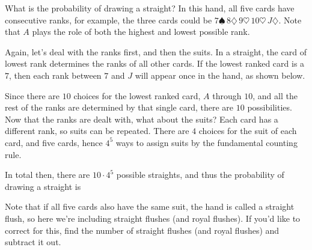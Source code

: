 \begin{examp}What is the probability of drawing a straight? In this hand, all five cards have consecutive ranks, for example, the three cards could be $7 \spadesuit \, 8\diamondsuit \, 9 \heartsuit \, 10 \heartsuit \, J \diamondsuit$. Note that $A$ plays the role of both the highest and lowest possible rank.
\par
\noindent Again, let's deal with the ranks first, and then the suits. In a straight, the card of lowest rank determines the ranks of all other cards. If the lowest ranked card is a $7$, then each rank between $7$ and $J$ will appear once in the hand, as shown below.

\vspace{-1em}
\begin{center}
\end{center}
\vspace{-1em}

\noindent Since there are $10$ choices for the lowest ranked card, $A$ through $10$, and all the rest of the ranks are determined by that single card, there are $10$ possibilities. Now that the ranks are dealt with, what about the suits? Each card has a different rank, so suits can be repeated. There are $4$ choices for the suit of each card, and five cards, hence $4^5$ ways to assign suits by the fundamental counting rule.
\par
\noindent In total then, there are $10 \cdot 4^5$ possible straights, and thus the probability of drawing a straight is 
\par
\noindent Note that if all five cards also have the same suit, the hand is called a straight flush, so here we're including straight flushes (and royal flushes). If you'd like to correct for this, find the number of straight flushes (and royal flushes) and subtract it out.

\end{examp}



